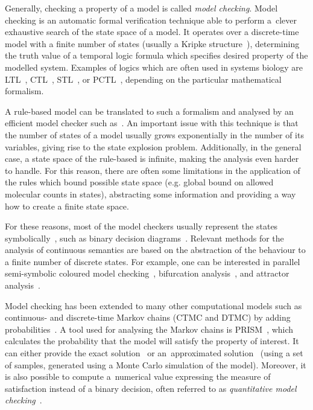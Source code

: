 \documentclass[11pt,a4paper]{report}
\begin{document}
Generally, checking a property of a model is called \emph{model checking}. Model checking is an automatic formal verification technique able to perform a~clever exhaustive search of the state space of a model. It operates over a discrete-time model with a finite number of states (usually a Kripke structure~\cite{kripke1963semantical}), determining the truth value of a temporal logic formula which specifies desired property of the modelled system. Examples of logics which are often used in systems biology are LTL~\cite{pnueli1977temporal}, CTL~\cite{clarke1986automatic}, STL~\cite{maler2004monitoring}, or PCTL~\cite{hasson1994logic}, depending on the particular mathematical formalism.

A rule-based model can be translated to such a formalism and analysed by an efficient model checker such as~\cite{cimatti2002nusmv}. An important issue with this technique is that the number of states of a model usually grows exponentially in the number of its variables, giving rise to the state explosion problem. Additionally, in the general case, a state space of the rule-based is infinite, making the analysis even harder to handle. For this reason, there are often some limitations in the application of the rules which bound possible state space (e.g. global bound on allowed molecular counts in states), abstracting some information and providing a way how to create a finite state space.

For these reasons, most of the model checkers usually represent the states symbolically~\cite{burch1992symbolic}, such as binary decision diagrams~\cite{bryant2001graph}. Relevant methods for the analysis of continuous semantics are based on the abstraction of the behaviour to a finite number of discrete states. For example, one can be interested in parallel semi-symbolic coloured model checking~\cite{benevs2016model}, bifurcation analysis~\cite{benevs2017discrete}, and attractor analysis~\cite{benevs2018fully}.

Model checking has been extended to many other computational models such as continuous- and discrete-time Markov chains (CTMC and DTMC) by adding probabilities~\cite{kwiatkowska2010probabilistic}. A tool used for analysing the Markov chains is PRISM~\cite{kwiatkowska2011prism}, which calculates the probability that the model will satisfy the property of interest. It can either provide the exact solution~\cite{aziz2000model} or an~approximated solution~\cite{jha2009bayesian} (using a set of samples, generated using a Monte Carlo simulation of the model). Moreover, it is also possible to compute a~numerical value expressing the measure of satisfaction instead of a binary decision, often referred to as \emph{quantitative model checking}~\cite{huth1997quantitative}.
\end{document}
